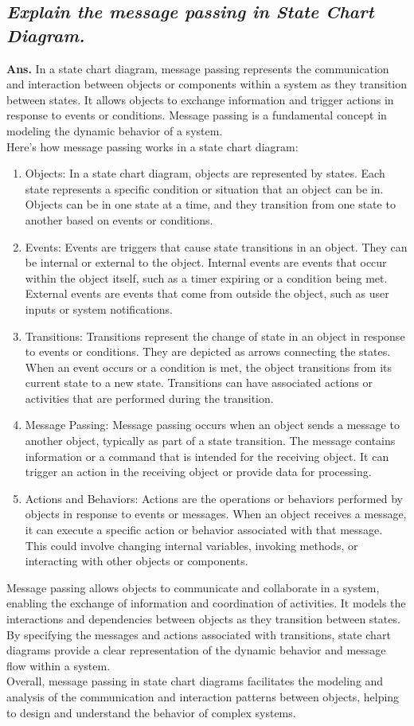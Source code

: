 \documentclass{article}
\begin{document}
\subsection{\textit{Explain the message passing in State Chart Diagram.}}
\textbf{Ans.} In a state chart diagram, message passing represents the communication and interaction between objects or components within a system as they transition between states. It allows objects to exchange information and trigger actions in response to events or conditions. Message passing is a fundamental concept in modeling the dynamic behavior of a system.\\

Here's how message passing works in a state chart diagram:
\begin{enumerate}
	\item Objects: In a state chart diagram, objects are represented by states. Each state represents a specific condition or situation that an object can be in. Objects can be in one state at a time, and they transition from one state to another based on events or conditions.
	\item Events: Events are triggers that cause state transitions in an object. They can be internal or external to the object. Internal events are events that occur within the object itself, such as a timer expiring or a condition being met. External events are events that come from outside the object, such as user inputs or system notifications.
	\item Transitions: Transitions represent the change of state in an object in response to events or conditions. They are depicted as arrows connecting the states. When an event occurs or a condition is met, the object transitions from its current state to a new state. Transitions can have associated actions or activities that are performed during the transition.
	\item Message Passing: Message passing occurs when an object sends a message to another object, typically as part of a state transition. The message contains information or a command that is intended for the receiving object. It can trigger an action in the receiving object or provide data for processing.
	\item Actions and Behaviors: Actions are the operations or behaviors performed by objects in response to events or messages. When an object receives a message, it can execute a specific action or behavior associated with that message. This could involve changing internal variables, invoking methods, or interacting with other objects or components.
\end{enumerate}
Message passing allows objects to communicate and collaborate in a system, enabling the exchange of information and coordination of activities. It models the interactions and dependencies between objects as they transition between states. By specifying the messages and actions associated with transitions, state chart diagrams provide a clear representation of the dynamic behavior and message flow within a system.\\

Overall, message passing in state chart diagrams facilitates the modeling and analysis of the communication and interaction patterns between objects, helping to design and understand the behavior of complex systems.
\end{document}
